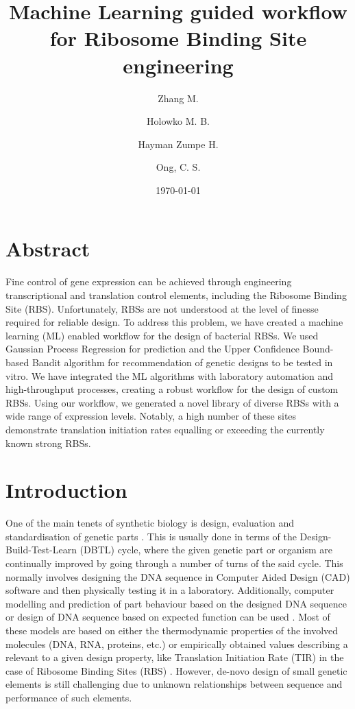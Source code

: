 \documentclass{article}
\title{Machine Learning guided workflow\\
for Ribosome Binding Site engineering}
\author[1,2,4]{Zhang M.}
\author[3]{Holowko M. B.}
\author[3]{Hayman Zumpe H.}
\author[1,2,4]{Ong, C. S.}
\affil[1]{Machine Learning and Artificial Intelligence Future Science Platform, CSIRO}
\affil[2]{Department of Computer Science, Australian National University}
\affil[3]{CSIRO Synthetic Biology Future Science Platform, CSIRO Land and Water}
\affil[4]{Data61, CSIRO}
\date{\today{}}
\begin{document}
\maketitle

\section*{Abstract}

Fine control of gene expression can be achieved through engineering transcriptional and translation control elements, including the Ribosome Binding Site (RBS).
Unfortunately, RBSs are not understood at the level of finesse required for reliable design. 
To address this problem, we have created a machine learning (ML) enabled workflow for the design of bacterial RBSs.
We used Gaussian Process Regression for prediction and the Upper Confidence Bound-based Bandit algorithm for recommendation of genetic designs to be tested in vitro.
We have integrated the ML algorithms with laboratory automation and high-throughput processes, creating a robust workflow for the design of custom RBSs.
Using our workflow, we generated a novel library of diverse RBSs with a wide range of expression levels.
Notably, a high number of these sites demonstrate translation initiation rates equalling or exceeding the currently known strong RBSs.

\section{Introduction}

One of the main tenets of synthetic biology is design, evaluation and standardisation of genetic parts \cite{Brophy2014,Canton2008,Stanton2014}.
This is usually done in terms of the Design-Build-Test-Learn (DBTL) cycle, where the given genetic part or organism are continually improved by going through a number of turns of the said cycle.
This normally involves designing the DNA sequence in Computer Aided Design (CAD) software and then physically testing it in a laboratory. 
Additionally, computer modelling and prediction of part behaviour based on the designed DNA sequence or design of DNA sequence based on expected function can be used \cite{Yeoh2019,Nielsen2016}.
Most of these models are based on either the thermodynamic properties of the involved molecules (DNA, RNA, proteins, etc.) or empirically obtained values describing a relevant to a given design property, like Translation Initiation Rate (TIR) in the case of Ribosome Binding Sites (RBS) \cite{Xia1998,Chen2013,Reeve2014}.
However, de-novo design of small genetic elements is still challenging due to unknown relationships between sequence and performance of such elements.\\
\end{document}
